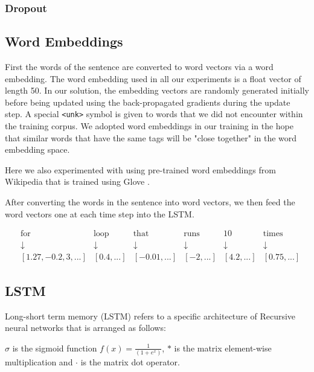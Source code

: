 \documentclass[fyp]{socreport}
\begin{document}
\subsubsection{Dropout}

\subsection{Word Embeddings}
First the words of the sentence are converted to word vectors via a word
embedding. The word embedding used in all our experiments is a float vector of
length 50. In our solution, the embedding vectors are randomly generated
initially before being updated using the back-propagated gradients during the
update step. A special \texttt{<unk>} symbol is given to words that we did not
encounter within the training corpus. We adopted word embeddings in our
training in the hope that similar words that have the same tags will be "close
together" in the word embedding space.

Here we also experimented with using pre-trained word embeddings from Wikipedia
that is trained using Glove \cite{pennington2014glove}.

After converting the words in the sentence into word vectors, we then feed the
word vectors one at each time step into the LSTM.

\begin{align*}
  &\text{for} &\text{loop } &\text{that } &\text{runs } &\text{10 } &\text{times } \\
  &\downarrow &\downarrow &\downarrow &\downarrow &\downarrow &\downarrow \\
  &[1.27, -0.2, 3, ...] &[0.4,...] &[-0.01, ...] &[-2, ...] &[4.2, ...] &[0.75, ...]
\end{align*}


\subsection{LSTM}
Long-short term memory (LSTM) refers to a specific architecture of Recursive
neural networks that is arranged as follows:


$\sigma$ is the sigmoid function $f(x) = \frac{1}{(1 + e^x)}$, $*$ is the
matrix element-wise multiplication and $\cdot$ is the matrix dot operator.
\end{document}
